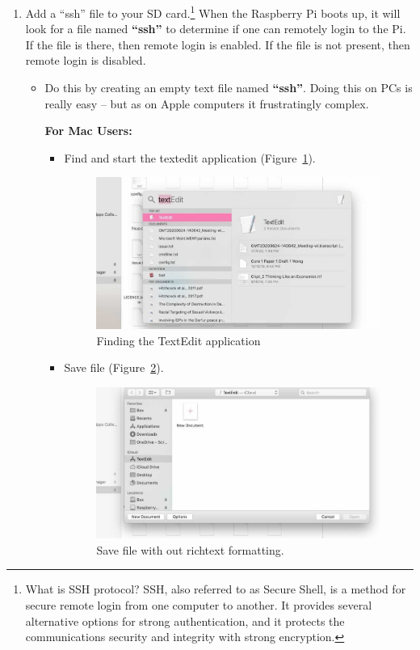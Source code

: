\documentclass{article}
\begin{document}
\begin{enumerate}
  \item Add a ``ssh'' file to your SD card.\footnote{What is SSH protocol? SSH, also referred to as Secure Shell, is a method for secure remote login from one computer to another. It provides several alternative options for strong authentication, and it protects the communications security and integrity with strong encryption.} When the Raspberry Pi boots up, it will look for a file named \textbf{``ssh''} to determine if one can remotely login to the Pi. If the file is there, then remote login is enabled. If the file is not present, then remote login is disabled. 
  \begin{itemize}
  \item Do this by creating an empty text file named \textbf{``ssh''}. Doing this on PCs is really easy -- but as on Apple computers it frustratingly complex. 
  
\noindent\textbf{For Mac Users:} 

\begin{itemize}
  \item Find and start the textedit application (Figure~\ref{fig:Mac1}).
  
\begin{figure}
\includegraphics[width=1.00\textwidth]{1_MACtext_1}
\caption{Finding the TextEdit application}
\label{fig:Mac1}
\end{figure}

  \item Save file (Figure~\ref{fig:Mac2}).

\begin{figure}
\includegraphics[width=1.00\textwidth]{1_MACtext_2}
\caption{Save file with out richtext formatting.}
\label{fig:Mac2}
\end{figure}


\end{itemize}
\end{itemize}
\end{enumerate}
\end{document}
